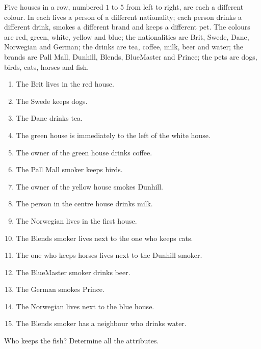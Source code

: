 Five houses in a row, numbered $1$ to $5$ from left to right, are each a different colour. In each lives a person of a different nationality; each person drinks a different drink, smokes a different brand and keeps a different pet. The colours are red, green, white, yellow and blue; the nationalities are Brit, Swede, Dane, Norwegian and German; the drinks are tea, coffee, milk, beer and water; the brands are Pall Mall, Dunhill, Blends, BlueMaster and Prince; the pets are dogs, birds, cats, horses and fish.
\begin{enumerate}
\item The Brit lives in the red house.
\item The Swede keeps dogs.
\item The Dane drinks tea.
\item The green house is immediately to the left of the white house.
\item The owner of the green house drinks coffee.
\item The Pall Mall smoker keeps birds.
\item The owner of the yellow house smokes Dunhill.
\item The person in the centre house drinks milk.
\item The Norwegian lives in the first house.
\item The Blends smoker lives next to the one who keeps cats.
\item The one who keeps horses lives next to the Dunhill smoker.
\item The BlueMaster smoker drinks beer.
\item The German smokes Prince.
\item The Norwegian lives next to the blue house.
\item The Blends smoker has a neighbour who drinks water.
\end{enumerate}
Who keeps the fish? Determine all the attributes.
